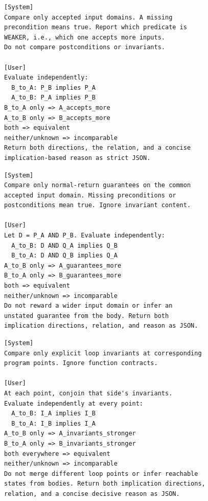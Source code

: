 \par\medskip\noindent
\begin{minipage}[t]{\columnwidth}
\begin{tcolorbox}[promptboxcompact, title={\textcolor{white}{Precondition judge}}, width=\linewidth]
\begin{lstlisting}[style=PromptInnerCompact]
[System]
Compare only accepted input domains. A missing
precondition means true. Report which predicate is
WEAKER, i.e., which one accepts more inputs.
Do not compare postconditions or invariants.

[User]
Evaluate independently:
  B_to_A: P_B implies P_A
  A_to_B: P_A implies P_B
B_to_A only => A_accepts_more
A_to_B only => B_accepts_more
both => equivalent
neither/unknown => incomparable
Return both directions, the relation, and a concise
implication-based reason as strict JSON.
\end{lstlisting}
\end{tcolorbox}
\end{minipage}\par\medskip\noindent
\begin{minipage}[t]{\columnwidth}
\begin{tcolorbox}[promptboxcompact, title={\textcolor{white}{Postcondition judge}}, width=\linewidth]
\begin{lstlisting}[style=PromptInnerCompact]
[System]
Compare only normal-return guarantees on the common
accepted input domain. Missing preconditions or
postconditions mean true. Ignore invariant content.

[User]
Let D = P_A AND P_B. Evaluate independently:
  A_to_B: D AND Q_A implies Q_B
  B_to_A: D AND Q_B implies Q_A
A_to_B only => A_guarantees_more
B_to_A only => B_guarantees_more
both => equivalent
neither/unknown => incomparable
Do not reward a wider input domain or infer an
unstated guarantee from the body. Return both
implication directions, relation, and reason as JSON.
\end{lstlisting}
\end{tcolorbox}
\end{minipage}\par\medskip\noindent
\begin{minipage}[t]{\columnwidth}
\begin{tcolorbox}[promptboxcompact, title={\textcolor{white}{Loop-invariant judge}}, width=\linewidth]
\begin{lstlisting}[style=PromptInnerCompact]
[System]
Compare only explicit loop invariants at corresponding
program points. Ignore function contracts.

[User]
At each point, conjoin that side's invariants.
Evaluate independently at every point:
  A_to_B: I_A implies I_B
  B_to_A: I_B implies I_A
A_to_B only => A_invariants_stronger
B_to_A only => B_invariants_stronger
both everywhere => equivalent
neither/unknown => incomparable
Do not merge different loop points or infer reachable
states from bodies. Return both implication directions,
relation, and a concise decisive reason as JSON.
\end{lstlisting}
\end{tcolorbox}
\end{minipage}
